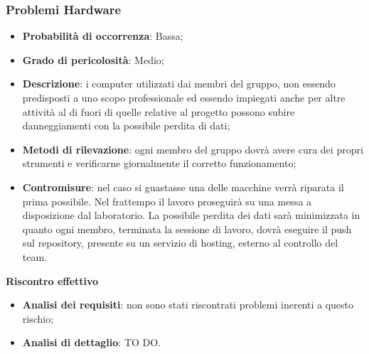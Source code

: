 		\subsubsection{Problemi Hardware} %
		\label{ssub:problemi_hardware}
			\begin{itemize}
				\item \textbf{Probabilità di occorrenza}: Bassa;
				\item \textbf{Grado di pericolosità}: Medio;
				\item \textbf{Descrizione}: i computer utilizzati dai membri del gruppo, non essendo predisposti a uno scopo professionale ed essendo impiegati anche per altre attività al di fuori di quelle relative al progetto possono subire danneggiamenti con la possibile perdita di dati;
				\item \textbf{Metodi di rilevazione}: ogni membro del gruppo dovrà avere cura dei propri strumenti e verificarne giornalmente il corretto funzionamento;
				\item \textbf{Contromisure}: nel caso si guastasse una delle macchine verrà riparata il prima possibile. Nel frattempo il lavoro proseguirà su una messa a disposizione dal laboratorio. La possibile perdita dei dati sarà minimizzata in quanto ogni membro, terminata la sessione di lavoro, dovrà eseguire il push sul repository, presente su un servizio di hosting, esterno al controllo del team.
			\end{itemize}
		\noindent
		\textbf{Riscontro effettivo}
			\begin{itemize}
				\item \textbf{Analisi dei requisiti}: non sono stati riscontrati problemi inerenti a questo rischio;
				\item \textbf{Analisi di dettaglio}: TO DO.
			\end{itemize}
		
